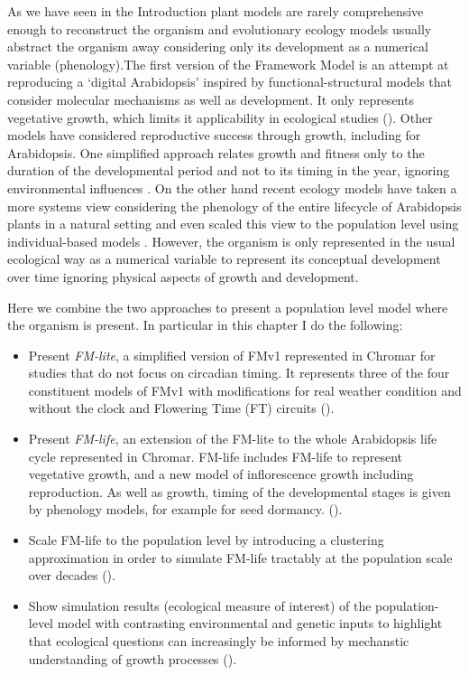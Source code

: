As we have seen in the Introduction plant models are rarely comprehensive enough
to reconstruct the organism and evolutionary ecology models usually abstract the
organism away considering only its development as a numerical variable
(phenology).The first version of the Framework Model
\citep[FMv1;][]{chew_multiscale_2014} is an attempt at reproducing a `digital
Arabidopsis' inspired by functional-structural models that consider molecular
mechanisms as well as development. It only represents vegetative growth, which
limits it applicability in ecological studies (). Other models
have considered reproductive success through growth, including for
Arabidopsis. One simplified approach relates growth and fitness only to the
duration of the developmental period and not to its timing in the year, ignoring
environmental influences \citep{prusinkiewicz_evolution_2007}. On the other hand
recent ecology models have taken a more systems view considering the phenology
of the entire lifecycle of Arabidopsis plants in a natural setting and even
scaled this view to the population level using individual-based models
\citep{burghardt_modeling_2015}. However, the organism is only represented in
the usual ecological way as a numerical variable to represent its conceptual
development over time ignoring physical aspects of growth and development.

Here we combine the two approaches to present a population level model where the
organism is present. In particular in this chapter I do the following:
\begin{itemize}
\item Present \emph{FM-lite}, a simplified version of FMv1
  \citep{chew_multiscale_2014} represented in Chromar for studies that do not
    focus on circadian timing. It represents three of the four constituent
    models of FMv1 with modifications for real weather condition and without the
    clock and Flowering Time (FT) circuits ().
  \item Present \emph{FM-life}, an extension of the FM-lite to the whole
    Arabidopsis life cycle represented in Chromar. FM-life includes FM-life to
    represent vegetative growth, and a new model of inflorescence growth
    including reproduction. As well as growth, timing of the developmental
    stages is given by phenology models, for example for seed
    dormancy. ().
\item Scale FM-life to the population level by introducing a clustering
  approximation in order to simulate FM-life tractably at the population scale
  over decades ().
\item Show simulation results (ecological measure of interest) of the
  population-level model with contrasting environmental and genetic inputs to
  highlight that ecological questions can increasingly be informed by mechanstic
  understanding of growth processes \citep{millar_intracellular_2016,
    doebeli_towards_2017} ().
\end{itemize}

